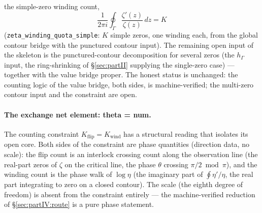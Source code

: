 \documentclass{article}
\newcommand{\zt}{\zeta}
\begin{document}
the simple-zero winding count,
\begin{equation}
  \frac{1}{2\pi i}\oint_{\Gamma}\frac{\zt'(z)}{\zt(z)}\,dz = K
\end{equation}
(\texttt{zeta\_winding\_quota\_simple}: $K$ simple zeros, one
winding each, from the global contour bridge with the punctured
contour input). The remaining open input of the skeleton is the
punctured-contour decomposition for several zeros (the $h_\Gamma$
input, the ring-shrinking of \S\ref{sec:partII} supplying the
single-zero case) --- together with the value bridge proper. The
honest status is unchanged: the counting logic of the value bridge,
both sides, is machine-verified; the multi-zero contour input and the
constraint are open.

\paragraph{The exchange net element: theta = num.}
The counting constraint $K_{\mathrm{flip}}=K_{\mathrm{wind}}$ has a
structural reading that isolates its open core. Both sides of the
constraint are phase quantities (direction data, no scale): the flip
count is an interlock crossing count along the observation line (the
real-part zeros of $\zt$ on the critical line, the phase $\theta$
crossing $\pi/2 \bmod \pi$), and the winding count is the phase walk
of $\log \eta$ (the imaginary part of $\oint \eta'/\eta$, the real
part integrating to zero on a closed contour). The scale (the eighth
degree of freedom) is absent from the constraint entirely --- the
machine-verified reduction of \S\ref{sec:partIV:route} is a pure
phase statement.
\end{document}
